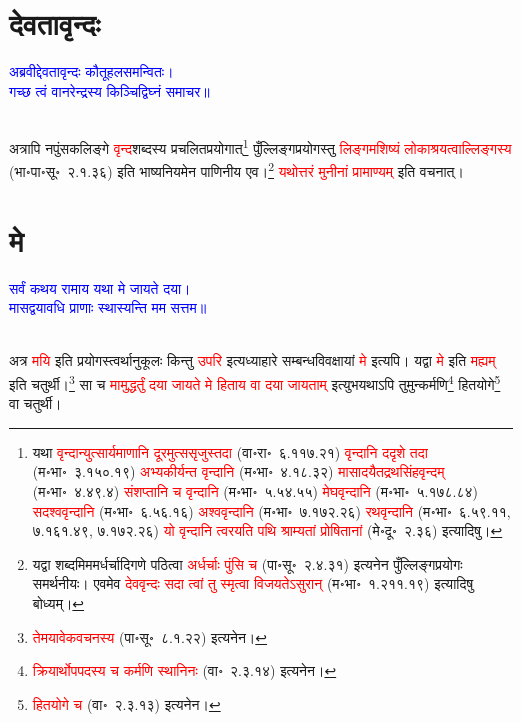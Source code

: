 \section[देवतावृन्दः]{देवतावृन्दः}
\centering\textcolor{blue}{अब्रवीद्देवतावृन्दः कौतूहलसमन्वितः।\nopagebreak\\
गच्छ त्वं वानरेन्द्रस्य किञ्चिद्विघ्नं समाचर॥}\nopagebreak\\
\\
\begin{sloppypar}\justifying\noindent\hspace{10mm} अत्रापि नपुंसक\-लिङ्गे \textcolor{red}{वृन्द}\-शब्दस्य प्रचलित\-प्रयोगात्\footnote{यथा \textcolor{red}{वृन्दान्युत्सार्यमाणानि दूरमुत्ससृजुस्तदा} (वा॰रा॰~६.११७.२१)  \textcolor{red}{वृन्दानि ददृशे तदा} (म॰भा॰~३.१५०.१९)  \textcolor{red}{अभ्यकीर्यन्त वृन्दानि} (म॰भा॰~४.१८.३२)  \textcolor{red}{मासादयैतद्रथसिंहवृन्दम्} (म॰भा॰~४.४९.४)  \textcolor{red}{संशप्तानि च वृन्दानि} (म॰भा॰~५.५४.५५)  \textcolor{red}{मेघवृन्दानि} (म॰भा॰~५.१७८.८४)  \textcolor{red}{सदश्ववृन्दानि} (म॰भा॰~६.५६.१६)  \textcolor{red}{अश्ववृन्दानि} (म॰भा॰~७.१७२.२६)  \textcolor{red}{रथवृन्दानि} (म॰भा॰~६.५९.११, ७.१६१.४९, ७.१७२.२६)  \textcolor{red}{यो वृन्‍दानि त्‍वरयति पथि श्राम्‍यतां प्रोषितानां} (मे॰दू॰~२.३६)  इत्यादिषु।} पुँल्लिङ्ग\-प्रयोगस्तु \textcolor{red}{लिङ्गमशिष्यं लोकाश्रयत्वाल्लिङ्गस्य} (भा॰पा॰सू॰~२.१.३६) इति भाष्य\-नियमेन पाणिनीय एव।\footnote{यद्वा शब्दमिममर्धर्चादिगणे पठित्वा \textcolor{red}{अर्धर्चाः पुंसि च} (पा॰सू॰~२.४.३१) इत्यनेन पुँल्लिङ्ग\-प्रयोगः समर्थनीयः। एवमेव \textcolor{red}{देववृन्दः सदा त्वां तु स्मृत्वा विजयतेऽसुरान्} (म॰भा॰~१.२११.१९)  इत्यादिषु बोध्यम्।} \textcolor{red}{यथोत्तरं मुनीनां प्रामाण्यम्‌} इति वचनात्।\end{sloppypar}
\section[मे]{मे}
\centering\textcolor{blue}{सर्वं कथय रामाय यथा मे जायते दया।\nopagebreak\\
मासद्वयावधि प्राणाः स्थास्यन्ति मम सत्तम॥}\nopagebreak\\
\\
\begin{sloppypar}\justifying\noindent\hspace{10mm} अत्र \textcolor{red}{मयि} इति प्रयोगस्त्वर्थानुकूलः किन्तु \textcolor{red}{उपरि} इत्यध्याहारे सम्बन्ध\-विवक्षायां \textcolor{red}{मे} इत्यपि। यद्वा \textcolor{red}{मे} इति \textcolor{red}{मह्यम्‌} इति चतुर्थी।\footnote{\textcolor{red}{तेमयावेकवचनस्य} (पा॰सू॰~८.१.२२) इत्यनेन।} सा च \textcolor{red}{मामुद्धर्तुं दया जायते मे हिताय वा दया जायताम्‌} इत्युभयथाऽपि तुमुन्कर्मणि\footnote{\textcolor{red}{क्रियार्थोपपदस्य च कर्मणि स्थानिनः} (वा॰~२.३.१४) इत्यनेन।} हित\-योगे\footnote{\textcolor{red}{हित\-योगे च} (वा॰~२.३.१३) इत्यनेन।} वा चतुर्थी।\end{sloppypar}
